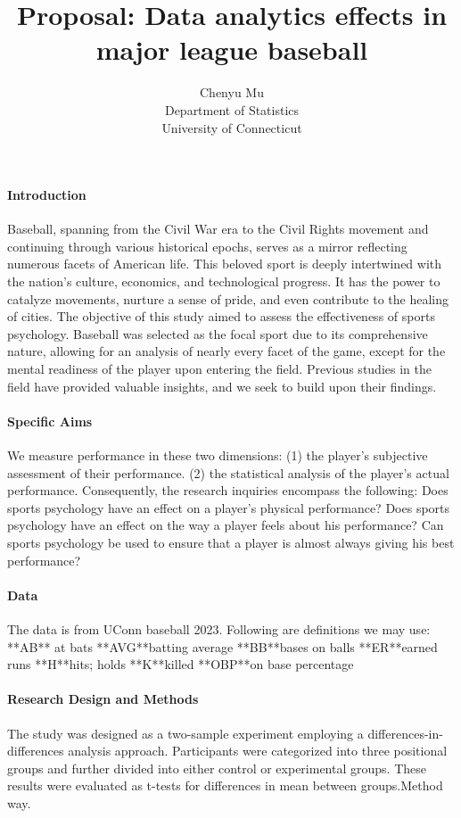 \documentclass[12pt]{article}
\title{Proposal: Data analytics effects in major league baseball}
\author{Chenyu Mu\\
  Department of Statistics\\
  University of Connecticut
}
\begin{document}
\maketitle


\paragraph{Introduction}
Baseball, spanning from the Civil War era to the Civil Rights movement and continuing through various historical epochs,
serves as a mirror reflecting numerous facets of American life. This beloved sport is deeply intertwined with the nation's culture,
economics, and technological progress. It has the power to catalyze movements, nurture a sense of pride, and even contribute to the healing of cities.
The objective of this study aimed to assess the effectiveness of sports psychology. Baseball was selected as the focal sport due to its comprehensive nature,
allowing for an analysis of nearly every facet of the game, except for the mental readiness of the player upon entering the field. Previous studies 
in the field \citep[e.g.,][]{Dalmass2018baseball} have provided valuable insights, and we seek to build upon their findings. 



\paragraph{Specific Aims}
We measure performance in these two dimensions: (1) the player's subjective assessment of their performance. 
(2) the statistical analysis of the player's actual performance. Consequently, the research inquiries encompass the following:
Does sports psychology have an effect on a player's physical performance?
Does sports psychology have an effect on the way a player feels about his performance?
Can sports psychology be used to ensure that a player is almost always giving his best performance?



\paragraph{Data}
The data is from UConn baseball 2023. Following are definitions we may use:
**AB** at bats 
**AVG**batting average 
**BB**bases on balls 
**ER**earned runs
**H**hits; holds
**K**killed 
**OBP**on base percentage



\paragraph{Research Design and Methods}
The study was designed as a two-sample experiment employing a differences-in-differences analysis approach.
Participants were categorized into three positional groups and further divided into either control or experimental groups. 
These results were evaluated as t-tests for differences in mean between groups.Method way\citep[e.g.,][]{Dalmass2018baseball}.
\end{document}
